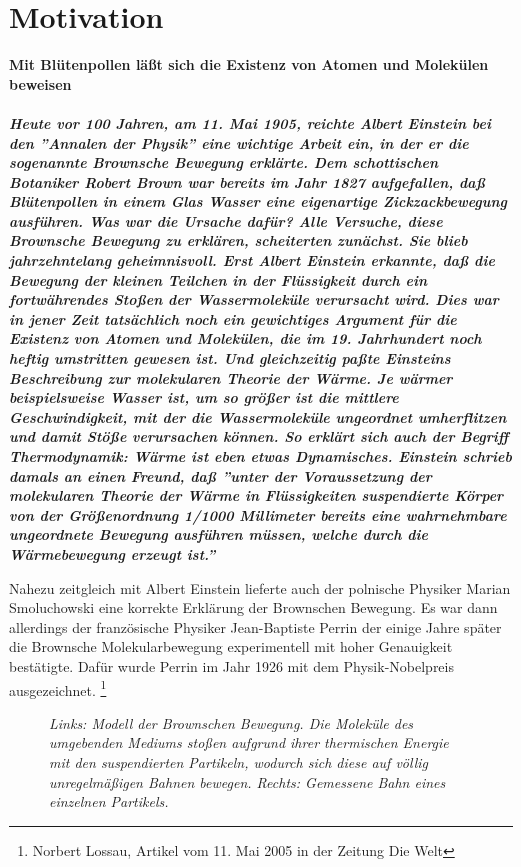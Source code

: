 \documentclass{../papanleitung}
\begin{document}
\section{Motivation}
\bf  Mit Bl\"{u}tenpollen l\"{a}{\ss}t sich die Existenz von Atomen und
Molek\"{u}len beweisen \it\\
\\\glqq Heute vor 100 Jahren, am 11. Mai 1905, reichte Albert
Einstein bei den ''Annalen der Physik'' eine wichtige Arbeit ein,
in der er die sogenannte Brownsche Bewegung erkl\"{a}rte. Dem
schottischen Botaniker Robert Brown war bereits im Jahr 1827
aufgefallen, da{\ss} Bl\"{u}tenpollen in einem Glas Wasser eine
eigenartige Zickzackbewegung ausf\"{u}hren. Was war die Ursache daf\"{u}r?
Alle Versuche, diese Brownsche Bewegung zu erkl\"{a}ren, scheiterten
zun\"{a}chst. Sie blieb jahrzehntelang geheimnisvoll. Erst Albert
Einstein erkannte, da{\ss} die Bewegung der kleinen Teilchen in der
Fl\"{u}ssigkeit durch ein fortw\"{a}hrendes Sto{\ss}en der Wassermolek\"{u}le
verursacht wird. Dies war in jener Zeit tats\"{a}chlich noch ein
gewichtiges Argument f\"{u}r die Existenz von Atomen und Molek\"{u}len,
die im 19. Jahrhundert noch heftig umstritten gewesen ist. Und
gleichzeitig pa{\ss}te Einsteins Beschreibung zur molekularen Theorie
der W\"{a}rme. Je w\"{a}rmer beispielsweise Wasser ist, um so gr\"{o}{\ss}er ist
die mittlere Geschwindigkeit, mit der die Wassermolek\"{u}le
ungeordnet umherflitzen und damit St\"{o}{\ss}e verursachen k\"{o}nnen. So
erkl\"{a}rt sich auch der Begriff Thermodynamik: W\"{a}rme ist eben etwas
Dynamisches. Einstein schrieb damals an einen Freund, da{\ss} ''unter
der Voraussetzung der molekularen Theorie der W\"{a}rme in
Fl\"{u}ssigkeiten suspendierte K\"{o}rper von der Gr\"{o}{\ss}enordnung 1/1000
Millimeter bereits eine wahrnehmbare ungeordnete Bewegung
ausf\"{u}hren m\"{u}ssen, welche durch die W\"{a}rmebewegung erzeugt ist.''


Nahezu zeitgleich mit Albert Einstein lieferte auch der polnische
Physiker Marian Smoluchowski eine korrekte Erkl\"{a}rung der
Brownschen Bewegung. Es war dann allerdings der franz\"{o}sische
Physiker Jean-Baptiste Perrin der einige Jahre sp\"{a}ter die
Brownsche Molekularbewegung experimentell mit hoher Genauigkeit
best\"{a}tigte. Daf\"{u}r wurde Perrin im Jahr 1926 mit dem
Physik-Nobelpreis ausgezeichnet. \grqq\rm\footnote{Norbert
     Lossau, Artikel vom 11. Mai 2005 in der Zeitung \glqq Die Welt\grqq}\newline

\begin{figure}[h]
\begin{minipage}[c]{12cm}
\centering{}
\caption{\label{249_brown0}\fontsize{10}{12}\it Links: Modell der
Brownschen Bewegung. Die Molek\"{u}le des umgebenden Mediums sto{\ss}en
aufgrund ihrer thermischen Energie mit den suspendierten
Partikeln, wodurch sich diese auf v\"{o}llig unregelm\"{a}{\ss}igen Bahnen
bewegen. Rechts: Gemessene Bahn eines einzelnen Partikels.}
\end{minipage}
\end{figure}
\end{document}
